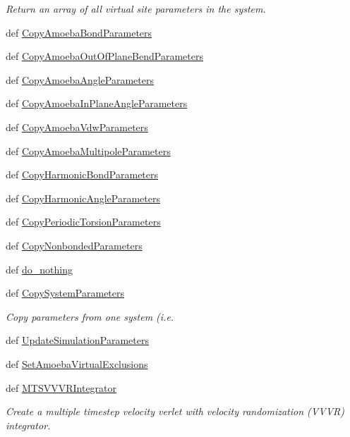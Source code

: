 \begin{DoxyCompactItemize}
\begin{DoxyCompactList}\small\item\em Return an array of all virtual site parameters in the system. \end{DoxyCompactList}\item 
def \hyperlink{namespaceforcebalance_1_1openmmio_a792a195b31612f2140b35927fe28fa1a}{Copy\-Amoeba\-Bond\-Parameters}
\item 
def \hyperlink{namespaceforcebalance_1_1openmmio_a2e95f600757655d41660c25af8fd8e80}{Copy\-Amoeba\-Out\-Of\-Plane\-Bend\-Parameters}
\item 
def \hyperlink{namespaceforcebalance_1_1openmmio_abe9a6b9b200dc8487e56dad7249af3ec}{Copy\-Amoeba\-Angle\-Parameters}
\item 
def \hyperlink{namespaceforcebalance_1_1openmmio_ad0d4739f80f2aab1a861f2e03b8efcd6}{Copy\-Amoeba\-In\-Plane\-Angle\-Parameters}
\item 
def \hyperlink{namespaceforcebalance_1_1openmmio_abe005f73c6dfe9ce1052c9434bcad9be}{Copy\-Amoeba\-Vdw\-Parameters}
\item 
def \hyperlink{namespaceforcebalance_1_1openmmio_a3706c19e71969cabe5782a4535abeffe}{Copy\-Amoeba\-Multipole\-Parameters}
\item 
def \hyperlink{namespaceforcebalance_1_1openmmio_a616f12cc53381716e5fa41f00bf623be}{Copy\-Harmonic\-Bond\-Parameters}
\item 
def \hyperlink{namespaceforcebalance_1_1openmmio_af4ed16f5e2b1cd12bce2f25fab1b05bc}{Copy\-Harmonic\-Angle\-Parameters}
\item 
def \hyperlink{namespaceforcebalance_1_1openmmio_a8f13702754f0b4e43e272139a2ce8341}{Copy\-Periodic\-Torsion\-Parameters}
\item 
def \hyperlink{namespaceforcebalance_1_1openmmio_afead47464a644d9225f9fa8eb568a8ed}{Copy\-Nonbonded\-Parameters}
\item 
def \hyperlink{namespaceforcebalance_1_1openmmio_a2bb7add6b813d94f2655372c51fe8fdc}{do\-\_\-nothing}
\item 
def \hyperlink{namespaceforcebalance_1_1openmmio_a8c6ed589ec2b35b8363a529ffdf88eb0}{Copy\-System\-Parameters}
\begin{DoxyCompactList}\small\item\em Copy parameters from one system (i.\-e. \end{DoxyCompactList}\item 
def \hyperlink{namespaceforcebalance_1_1openmmio_a9f9fc56475dbfcc94a40fef6a84ed25f}{Update\-Simulation\-Parameters}
\item 
def \hyperlink{namespaceforcebalance_1_1openmmio_a95d91538d72e354fc95433539c42450c}{Set\-Amoeba\-Virtual\-Exclusions}
\item 
def \hyperlink{namespaceforcebalance_1_1openmmio_aa085594c11e9cd00ce71f5a8ead72b68}{M\-T\-S\-V\-V\-V\-R\-Integrator}
\begin{DoxyCompactList}\small\item\em Create a multiple timestep velocity verlet with velocity randomization (V\-V\-V\-R) integrator. \end{DoxyCompactList}\end{DoxyCompactItemize}
